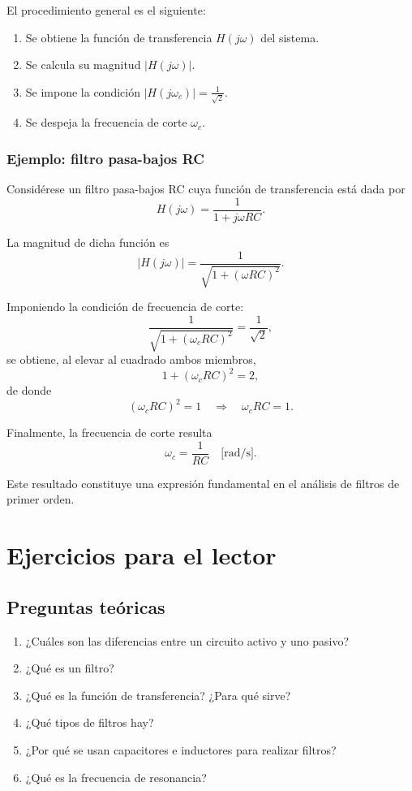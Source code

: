 El procedimiento general es el siguiente:
\begin{enumerate}
  \item Se obtiene la función de transferencia \(H(j\omega)\) del sistema.
  \item Se calcula su magnitud \(|H(j\omega)|\).
  \item Se impone la condición \(|H(j\omega_c)| = \frac{1}{\sqrt{2}}\).
  \item Se despeja la frecuencia de corte \(\omega_c\).
\end{enumerate}

\subsubsection{Ejemplo: filtro pasa-bajos RC}

Considérese un filtro pasa-bajos RC cuya función de transferencia está dada por
\[
H(j\omega) = \frac{1}{1 + j\omega RC}.
\]

La magnitud de dicha función es
\[
|H(j\omega)| = \frac{1}{\sqrt{1 + (\omega RC)^2}}.
\]

Imponiendo la condición de frecuencia de corte:
\[
\frac{1}{\sqrt{1 + (\omega_c RC)^2}} = \frac{1}{\sqrt{2}},
\]
se obtiene, al elevar al cuadrado ambos miembros,
\[
1 + (\omega_c RC)^2 = 2,
\]
de donde
\[
(\omega_c RC)^2 = 1 \quad \Rightarrow \quad \omega_c RC = 1.
\]

Finalmente, la frecuencia de corte resulta
\[
\omega_c = \frac{1}{RC} \quad \text{[rad/s]}.
\]

Este resultado constituye una expresión fundamental en el análisis de filtros de primer orden.

\section{Ejercicios para el lector}

\subsection{Preguntas teóricas}

\begin{enumerate}
  \item ¿Cuáles son las diferencias entre un circuito activo y uno pasivo?
  \item ¿Qué es un filtro?
  \item ¿Qué es la función de transferencia? ¿Para qué sirve?
  \item ¿Qué tipos de filtros hay?
  \item ¿Por qué se usan capacitores e inductores para realizar filtros?
  \item ¿Qué es la frecuencia de resonancia?
\end{enumerate}

